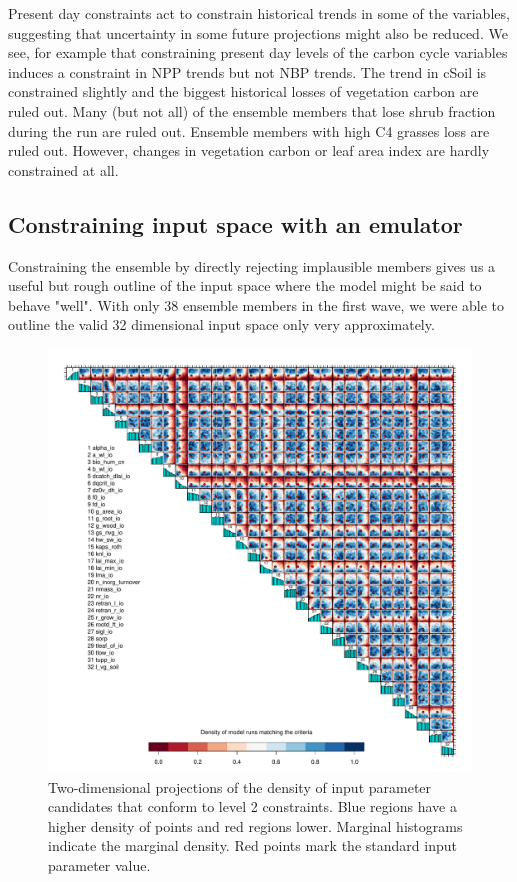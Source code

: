 \documentclass[gmd, manuscript]{copernicus}
\begin{document}
Present day constraints act to constrain historical trends in some of the variables, suggesting that uncertainty in some future projections might also be reduced. We see, for example that constraining present day levels of the carbon cycle variables induces a constraint in NPP trends but not NBP trends. The trend in cSoil is constrained slightly and the biggest historical losses of vegetation carbon are ruled out. Many (but not all) of the ensemble members that lose shrub fraction during the run are ruled out. Ensemble members with high C4 grasses loss are ruled out. However, changes in vegetation carbon or leaf area index are hardly constrained at all.





\subsection{Constraining input space with an emulator}\label{ssec:constraining_input_space_emulator}

Constraining the ensemble by directly rejecting implausible members gives us a useful but rough outline of the input space where the model might be said to behave "well". With only 38 ensemble members in the first wave, we were able to outline the valid 32 dimensional input space only very approximately.

\begin{figure}[t]
\includegraphics[width=12cm]{./figs/fig06.pdf}
\caption{Two-dimensional projections of the density of input parameter candidates that conform to level 2 constraints. Blue regions have a higher density of points and red regions lower. Marginal histograms indicate the marginal density. Red points mark the standard input parameter value.}
\label{fig:pairs_level2_ix_em_unif_wave00_wave01}
\end{figure}
\end{document}
